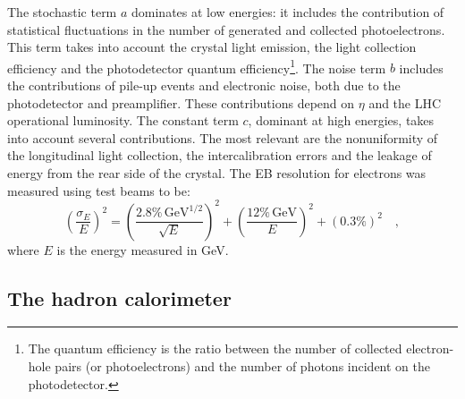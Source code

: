 The stochastic term $a$ dominates at low energies: it includes the contribution of statistical fluctuations in the number of generated and collected photoelectrons. This term takes into account the crystal light emission, the light collection efficiency and the photodetector quantum efficiency\footnote{The quantum efficiency is the ratio between the number of collected electron-hole pairs (or photoelectrons) and the number of photons incident on the photodetector.}. The noise term $b$ includes the contributions of pile-up events and electronic noise, both due to the photodetector and preamplifier. These contributions depend on $\eta$ and the LHC operational luminosity.
The constant term $c$, dominant at high energies, takes into account several contributions. The most relevant are the nonuniformity of the longitudinal light collection, the intercalibration errors and the leakage of energy from the rear side of the crystal. The EB resolution for electrons was measured using test beams to be:
\begin{equation}
\left(\frac{\sigma_E}{E}\right)^2 = \left(\frac{2.8\%\,\mathrm{GeV^{1/2}}}{\sqrt{E}}\right)^2 + \left(\frac{12\%\,\mathrm{GeV}}{E}\right)^2 + (0.3\%)^2 \quad,
\end{equation}
where $E$ is the energy measured in GeV.

\subsection{The hadron calorimeter}

